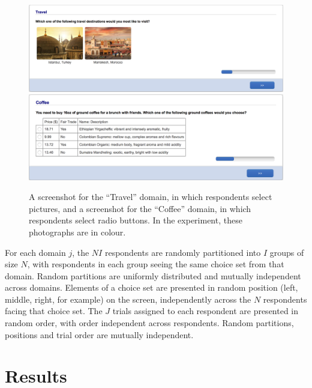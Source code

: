 \documentclass[11pt,letter]{article}
\begin{document}
\begin{figure}
	\begin{center}
	\includegraphics[width=15cm]{Population_study_design/screenshot_Travel.png}
	\includegraphics[width=15cm]{Population_study_design/screenshot_Coffee.png}
	\caption{A screenshot for the ``Travel'' domain, in which respondents select pictures, and a screenshot for the ``Coffee'' domain, in which respondents select radio buttons. In the experiment, these photographs are in colour.}\label{f:screenshots}
	\end{center}
\end{figure}

For each domain $j$, the $NI$ respondents are randomly partitioned into $I$ groups of size $N$, with respondents in each group seeing the same choice set from that domain.
Random partitions are uniformly distributed and mutually independent across domains.
Elements of a choice set are presented in random position (left, middle, right, for example) on the screen, independently across the $N$ respondents facing that choice set.
The $J$ trials assigned to each respondent are presented in random
order, with order independent across respondents.
Random partitions, positions and trial order are mutually independent.

\section{Results}\label{s:results}
\end{document}

